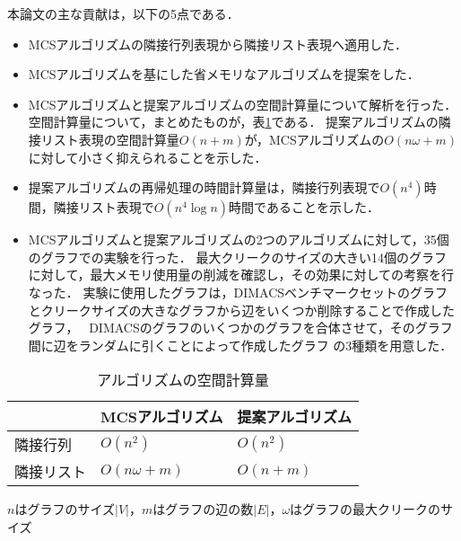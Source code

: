 本論文の主な貢献は，以下の5点である．
\begin{itemize}
    \item MCSアルゴリズムの隣接行列表現から隣接リスト表現へ適用した．
    \item MCSアルゴリズムを基にした省メモリなアルゴリズムを提案をした．
    \item MCSアルゴリズムと提案アルゴリズムの空間計算量について解析を行った．
	空間計算量について，まとめたものが，表\ref{tab:result-mem}である．
	提案アルゴリズムの隣接リスト表現の空間計算量$O(n+m)$が，MCSアルゴリズムの$O(n \omega + m )$に対して小さく抑えられることを示した．
    \item %
	提案アルゴリズムの再帰処理の時間計算量は，隣接行列表現で$O(n^4)$時間，隣接リスト表現で$O(n^4 \log n)$時間であることを示した．

    \item MCSアルゴリズムと提案アルゴリズムの2つのアルゴリズムに対して，35個のグラフでの実験を行った．
	最大クリークのサイズの大きい14個のグラフに対して，最大メモリ使用量の削減を確認し，その効果に対しての考察を行なった．
実験に使用したグラフは，DIMACSベンチマークセットのグラフ\footnotemark[1]
とクリークサイズの大きなグラフから辺をいくつか削除することで作成したグラフ，　
DIMACSのグラフのいくつかのグラフを合体させて，そのグラフ間に辺をランダムに引くことによって作成したグラフ
の3種類を用意した．

\end{itemize}

\begin{table}[p]
\centering
\caption{アルゴリズムの空間計算量}
\label{tab:result-mem}
    \begin{tabular}{|l|l|l|}
\hline
 & MCSアルゴリズム &  提案アルゴリズム   \\ \hline
隣接行列 & $O(n^2)$ & $O(n^2)$  \\ \hline
隣接リスト & $O(n \omega +m )$ & $ O(n + m ) $   \\ \hline

\end{tabular}
    \begin{center}
    \small{  $n$はグラフのサイズ$|V|$，$m$はグラフの辺の数$|E|$，$\omega$はグラフの最大クリークのサイズ }
    \end{center}
\end{table}



